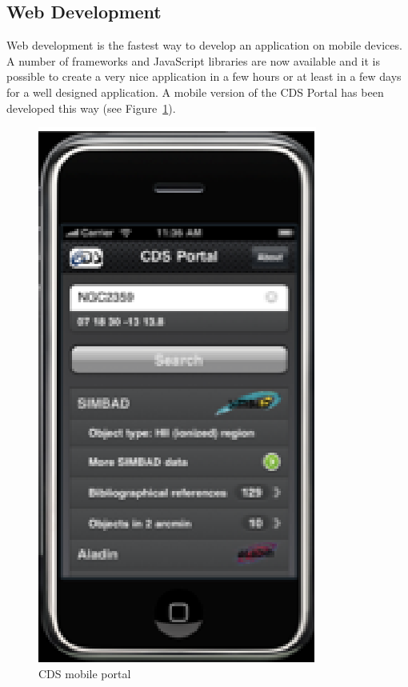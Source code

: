\subsection{Web Development}
Web development is the fastest way to develop an application on mobile devices. A number of frameworks and JavaScript libraries are now available and it is possible to create a very nice application in a few hours or at least in a few days for a well designed application. A mobile version of the CDS Portal has been developed this way (see Figure~\ref{O28:1}).

\begin{figure}[ht] \center
\includegraphics[scale=0.7]{part5/Schaaff_O28/O28_f4.eps}
\caption{CDS mobile portal} 
\label{O28:1}
\end{figure}

